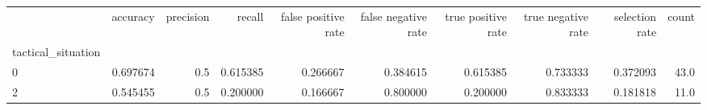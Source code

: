 \begin{tabular}{lrrrrrrrrr}
\toprule
{} &  accuracy &  precision &    recall &  false positive rate &  false negative rate &  true positive rate &  true negative rate &  selection rate &  count \\
tactical\_situation &           &            &           &                      &                      &                     &                     &                 &        \\
\midrule
0                  &  0.697674 &        0.5 &  0.615385 &             0.266667 &             0.384615 &            0.615385 &            0.733333 &        0.372093 &   43.0 \\
2                  &  0.545455 &        0.5 &  0.200000 &             0.166667 &             0.800000 &            0.200000 &            0.833333 &        0.181818 &   11.0 \\
\bottomrule
\end{tabular}
